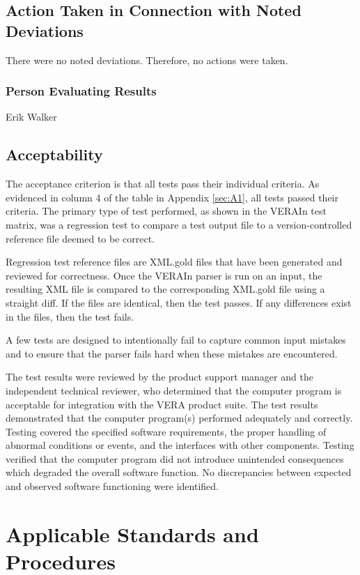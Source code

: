 \documentclass{vera-ornltm}
\begin{document}
\subsection{Action Taken in Connection with Noted Deviations}
There were no noted deviations. Therefore, no actions were taken.
\subsubsection{Person Evaluating Results}
Erik Walker
\subsection{Acceptability}
The acceptance criterion is that all tests pass their individual criteria. As evidenced in column 4 of the table in Appendix \ref{sec:A1}, all tests passed their criteria.
The primary type of test performed, as shown in the VERAIn test matrix, was a regression test to compare a test output file to a version-controlled reference file deemed to be correct.

Regression test reference files are XML.gold files that have been generated and reviewed for correctness.
Once the VERAIn parser is run on an input, the resulting XML file is compared to the corresponding XML.gold file using a straight diff. If the files are identical, then the test passes. If any differences exist in the files, then the test fails. 

A few tests are designed to intentionally fail to capture common input mistakes and to ensure that the parser fails hard when these mistakes are encountered.  

The test results were reviewed by the product support manager and the independent technical reviewer, who determined that the computer program is acceptable for integration with the VERA product suite.
The test results demonstrated that the computer program(s) performed adequately and correctly.
Testing covered the specified software requirements, the proper handling of abnormal conditions or events, and the interfaces with other components. 
Testing verified that the computer program did not introduce unintended consequences which degraded the overall software function. 
No discrepancies between expected and observed software functioning were identified.


\section{Applicable Standards and Procedures}
\end{document}
